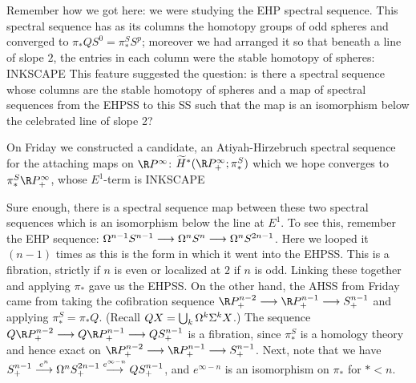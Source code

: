 Remember how we got here: we were studying the EHP spectral sequence.  This spectral sequence has as its columns the homotopy groups of odd spheres and converged to $\pi_* QS^0 = \pi_*^S S^p$; moreover we had arranged it so that beneath a line of slope $2$, the entries in each column were the stable homotopy of spheres: INKSCAPE  This feature suggested the question: is there a spectral sequence whose columns are the stable homotopy of spheres and a map of spectral sequences from the EHPSS to this SS such that the map is an isomorphism below the celebrated line of slope 2?

On Friday we constructed a candidate, an Atiyah-Hirzebruch spectral sequence for the attaching maps on $\RP^\infty$: $\widetilde H^*(\RP^\infty_+; \pi_*^S)$ which we hope converges to $\pi_*^S \RP^\infty_+$, whose $E^1$-term is INKSCAPE

Sure enough, there is a spectral sequence map between these two spectral sequences which is an isomorphism below the line at $E^1$.  To see this, remember the EHP sequence: $\Omega^{n-1} S^{n-1} \longrightarrow \Omega^n S^n \longrightarrow \Omega^n S^{2n-1}$.  Here we looped it $(n-1)$ times as this is the form in which it went into the EHPSS.  This is a fibration, strictly if $n$ is even or localized at $2$ if $n$ is odd.  Linking these together and applying $\pi_*$ gave us the EHPSS.  On the other hand, the AHSS from Friday came from taking the cofibration sequence $\RP^{n-2}_+ \to \RP^{n-1}_+ \to S^{n-1}_+$ and applying $\pi_*^S = \pi_* Q$.  (Recall $QX = \bigcup_k \Omega^k \Sigma^k X$.)  The sequence $Q\RP^{n-2}_+ \to Q\RP^{n-1}_+ \to QS^{n-1}_+$ is a fibration, since $\pi_*^S$ is a homology theory and hence exact on $\RP^{n-2}_+ \to \RP^{n-1}_+ \to S^{n-1}_+$.  Next, note that we have $S^{n-1}_+ \stackrel{e^n}{\longrightarrow} \Omega^n S^{2n-1}_+ \stackrel{e^{\infty-n}}{\longrightarrow} QS^{n-1}_+$, and $e^{\infty-n}$ is an isomorphism on $\pi_*$ for $* < n$.

